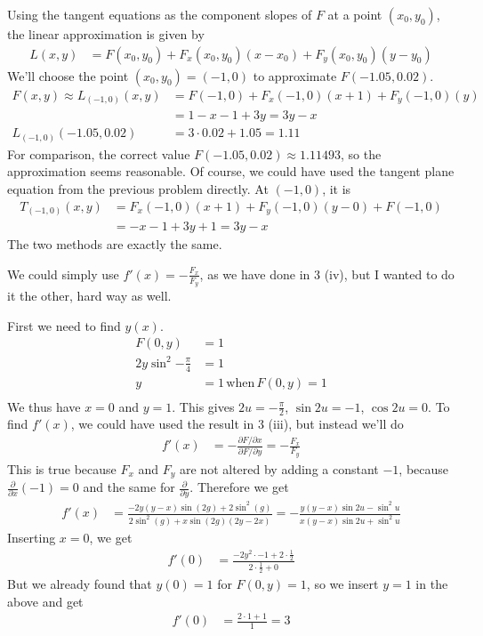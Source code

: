 \documentclass[a4paper,norsk,12pt]{article}
\begin{document}
Using the tangent equations as the component slopes of $F$ at a point $(x_0,
y_0)$, the linear approximation is given by
\begin{align*}
  L(x,y) &= F(x_0, y_0) + F_x(x_0, y_0)(x-x_0) + F_y(x_0, y_0)(y-y_0)
\end{align*}
We'll choose the point $(x_0, y_0) = (-1, 0)$ to approximate $F(-1.05, 0.02)$.
\begin{align*}
  F(x,y) \approx
  L_{(-1,0)}(x,y)
    &= F(-1,0) + F_x(-1,0)(x+1) + F_y(-1,0)(y) \\
    &= 1 - x - 1 + 3y = 3y-x \\
  L_{(-1,0)}(-1.05, 0.02)
    &= 3\cdot0.02 + 1.05 = 1.11
\end{align*}
For comparison, the correct value $F(-1.05, 0.02) \approx 1.11493$, so the
approximation seems reasonable. Of course, we could have used the tangent plane
equation from the previous problem directly. At $(-1,0)$, it is
\begin{align*}
  T_{(-1,0)}(x,y)
    &= F_x(-1,0)(x+1) + F_y(-1,0)(y-0) + F(-1,0)\\
    &= -x-1 + 3y + 1 = 3y-x
\end{align*}
The two methods are exactly the same.

\clearpage
{}
We could simply use $f'(x) = -\frac{F_x}{F_y}$, as we have done in 3 (iv), but
I wanted to do it the other, hard way as well.



First we need to find $y(x)$.
\begin{align*}
  F(0,y) &= 1 \\
  2y\sin^2{-\frac{\pi}{4}} &= 1\\
  y &= 1 \,\text{when}\, F(0,y)=1\\
\end{align*}
We thus have $x=0$ and $y=1$. This gives $2u = -\frac{\pi}{2}$, $\sin{2u} =
-1$, $\cos{2u} = 0$. To find $f'(x)$, we could have used the result in 3 (iii),
but instead we'll do
\begin{align*}
  f'(x) &= -\frac{\partial F / \partial x}{\partial F / \partial y}
  = -\frac{F_x}{F_y}
\end{align*}
This is true because $F_x$ and $F_y$ are not altered by adding a constant $-1$,
because $\frac{\partial}{\partial x}\left(-1\right) = 0$ and the same for
$\frac{\partial}{\partial y}$. Therefore we get
\begin{align*}
  f'(x) &= \frac{-2y(y-x)\sin{(2g)}+2\sin^2{(g)}}
                {2\sin^2{(g)}+x\sin{(2g)}(2y-2x)}
      = -\frac{y(y-x)\sin{2u} - \sin^2{u}}
              {x(y-x)\sin{2u} + \sin^2{u}}
\end{align*}
Inserting $x=0$, we get
\begin{align*}
  f'(0) &= \frac{-2y^2\cdot-1 + 2\cdot\frac{1}{2}}{2\cdot\frac{1}{2}+0}
\end{align*}
But we already found that $y(0)=1$ for $F(0,y)=1$, so we insert $y=1$ in the
above and get
\begin{align*}
  f'(0) &= \frac{2\cdot1 + 1}{1} = 3
\end{align*}
\end{document}
